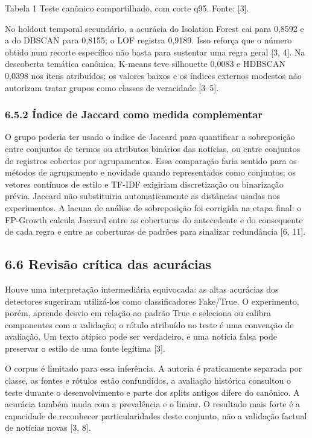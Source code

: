 \documentclass[
  brazilian,
  11pt,
]{article}
\begin{document}
Tabela 1 Teste canônico compartilhado, com corte q95. Fonte: {[}3{]}.

No holdout temporal secundário, a acurácia do Isolation Forest cai para 0,8592 e a do DBSCAN para 0,8155; o LOF registra 0,9189. Isso reforça que o número obtido num recorte específico não basta para sustentar uma regra geral {[}3, 4{]}. Na descoberta temática canônica, K-means teve silhouette 0,0083 e HDBSCAN 0,0398 nos itens atribuídos; os valores baixos e os índices externos modestos não autorizam tratar grupos como classes de veracidade {[}3--5{]}.

\subsubsection{6.5.2 Índice de Jaccard como medida complementar}\label{uxedndice-de-jaccard-como-medida-complementar}

O grupo poderia ter usado o índice de Jaccard para quantificar a sobreposição entre conjuntos de termos ou atributos binários das notícias, ou entre conjuntos de registros cobertos por agrupamentos. Essa comparação faria sentido para os métodos de agrupamento e novidade quando representados como conjuntos; os vetores contínuos de estilo e TF-IDF exigiriam discretização ou binarização prévia. Jaccard não substituiria automaticamente as distâncias usadas nos experimentos. A lacuna de análise de sobreposição foi corrigida na etapa final: o FP-Growth calcula Jaccard entre as coberturas do antecedente e do consequente de cada regra e entre as coberturas de padrões para sinalizar redundância {[}6, 11{]}.

\subsection{6.6 Revisão crítica das acurácias}\label{revisuxe3o-cruxedtica-das-acuruxe1cias}

Houve uma interpretação intermediária equivocada: as altas acurácias dos detectores sugeriram utilizá-los como classificadores Fake/True. O experimento, porém, aprende desvio em relação ao padrão True e seleciona ou calibra componentes com a validação; o rótulo atribuído no teste é uma convenção de avaliação. Um texto atípico pode ser verdadeiro, e uma notícia falsa pode preservar o estilo de uma fonte legítima {[}3{]}.

O corpus é limitado para essa inferência. A autoria é praticamente separada por classe, as fontes e rótulos estão confundidos, a avaliação histórica consultou o teste durante o desenvolvimento e parte dos splits antigos difere do canônico. A acurácia também muda com a prevalência e o limiar. O resultado mais forte é a capacidade de reconhecer particularidades deste conjunto, não a validação factual de notícias novas {[}3, 8{]}.
\end{document}
